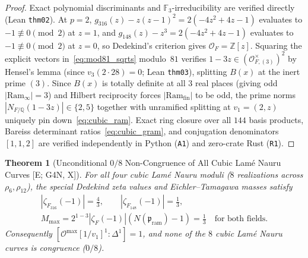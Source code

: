 \documentclass[11pt]{amsart}
\numberwithin{equation}{section}
\theoremstyle{plain}
\newtheorem{theorem}{Theorem}[section]
\theoremstyle{definition}\newtheorem{definition}[theorem]{Definition}
\theoremstyle{remark}\newtheorem{remark}[theorem]{Remark}
\newcommand{\Q}{\mathbb{Q}}
\newcommand{\Z}{\mathbb{Z}}
\newcommand{\F}{\mathbb{F}}
\newcommand{\calO}{\mathcal{O}}
\newcommand{\frp}{\mathfrak{p}}
\newcommand{\Ram}{\mathrm{Ram}}
\newcommand{\ctag}[1]{\textup{\textsf{\scriptsize[#1]}}}
\begin{document}
\begin{proof}
Exact polynomial discriminants and $\F_3$-irreducibility are verified directly (Lean \texttt{thm02}). At $p=2$, $g_{316}(z)-z(z-1)^2 = 2(-4z^2+4z-1)$ evaluates to $-1\not\equiv 0\pmod 2$ at $z=1$, and $g_{148}(z)-z^3 = 2(-4z^2+4z-1)$ evaluates to $-1\not\equiv 0\pmod 2$ at $z=0$, so Dedekind's criterion gives $\calO_F=\Z[z]$. Squaring the explicit vectors in~\eqref{eq:mod81_sqrts} modulo~$81$ verifies $1-3z\in (\calO_{F,(3)}^\times)^2$ by Hensel's lemma (since $v_3(2\cdot 28)=0$; Lean \texttt{thm03}), splitting $B(x)$ at the inert prime $(3)$. Since $B(x)$ is totally definite at all $3$ real places (giving odd $|\Ram_\infty|=3$) and Hilbert reciprocity forces $|\Ram_{\mathrm{fin}}|$ to be odd, the prime norms $|N_{F/\Q}(1-3z)| \in \{2, 5\}$ together with unramified splitting at $v_1=(2,z)$ uniquely pin down~\eqref{eq:cubic_ram}. Exact ring closure over all $144$ basis products, Bareiss determinant ratios~\eqref{eq:cubic_gram}, and conjugation denominators $[1,1,2]$ are verified independently in Python (\texttt{A1}) and zero-crate Rust (\texttt{R1}).
\end{proof}

\begin{theorem}[Unconditional $0/8$ Non-Congruence of All Cubic Lam\'e Nauru Curves \ctag{E; G4N, X}]\label{thm:cubic_noncong}
For all four cubic Lam\'e Nauru moduli ($8$ realizations across $\rho_6,\rho_{12}$), the special Dedekind zeta values and Eichler--Tamagawa masses \cite{eichler1955,vigneras1980,voight2021} satisfy
\begin{equation}\label{eq:cubic_mass}
\begin{gathered}
|\zeta_{F_{316}}(-1)| = \frac{4}{3},\qquad |\zeta_{F_{148}}(-1)| = \frac{1}{3},\\
M_{\max} = 2^{1-3}|\zeta_F(-1)|(N(\frp_{\mathrm{ram}})-1) = \frac{1}{3} \quad \text{for both fields}.
\end{gathered}
\end{equation}
Consequently $[\calO^{\max}[1/v_1]^1 : \Delta^1] = 1$, and \emph{none} of the $8$ cubic Lam\'e Nauru curves is congruence ($0/8$).
\end{theorem}
\end{document}
